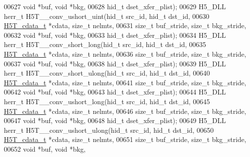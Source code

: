 \begin{DoxyCode}
00627                                    \textcolor{keywordtype}{void} *buf, \textcolor{keywordtype}{void} *bkg,
00628                                    hid\_t dset\_xfer\_plist);
00629 H5\_DLL herr\_t H5T\_\_conv\_ushort\_uint(hid\_t src\_id, hid\_t dst\_id,
00630                     \hyperlink{struct_h5_t__cdata__t}{H5T\_cdata\_t} *cdata, \textcolor{keywordtype}{size\_t} nelmts,
00631                     \textcolor{keywordtype}{size\_t} buf\_stride, \textcolor{keywordtype}{size\_t} bkg\_stride,
00632                                     \textcolor{keywordtype}{void} *buf, \textcolor{keywordtype}{void} *bkg,
00633                                     hid\_t dset\_xfer\_plist);
00634 H5\_DLL herr\_t H5T\_\_conv\_short\_long(hid\_t src\_id, hid\_t dst\_id,
00635                    \hyperlink{struct_h5_t__cdata__t}{H5T\_cdata\_t} *cdata, \textcolor{keywordtype}{size\_t} nelmts,
00636                    \textcolor{keywordtype}{size\_t} buf\_stride, \textcolor{keywordtype}{size\_t} bkg\_stride,
00637                                    \textcolor{keywordtype}{void} *buf, \textcolor{keywordtype}{void} *bkg,
00638                                    hid\_t dset\_xfer\_plist);
00639 H5\_DLL herr\_t H5T\_\_conv\_short\_ulong(hid\_t src\_id, hid\_t dst\_id,
00640                     \hyperlink{struct_h5_t__cdata__t}{H5T\_cdata\_t} *cdata, \textcolor{keywordtype}{size\_t} nelmts,
00641                     \textcolor{keywordtype}{size\_t} buf\_stride, \textcolor{keywordtype}{size\_t} bkg\_stride,
00642                                     \textcolor{keywordtype}{void} *buf, \textcolor{keywordtype}{void} *bkg,
00643                                     hid\_t dset\_xfer\_plist);
00644 H5\_DLL herr\_t H5T\_\_conv\_ushort\_long(hid\_t src\_id, hid\_t dst\_id,
00645                     \hyperlink{struct_h5_t__cdata__t}{H5T\_cdata\_t} *cdata, \textcolor{keywordtype}{size\_t} nelmts,
00646                     \textcolor{keywordtype}{size\_t} buf\_stride, \textcolor{keywordtype}{size\_t} bkg\_stride,
00647                                     \textcolor{keywordtype}{void} *buf, \textcolor{keywordtype}{void} *bkg,
00648                                     hid\_t dset\_xfer\_plist);
00649 H5\_DLL herr\_t H5T\_\_conv\_ushort\_ulong(hid\_t src\_id, hid\_t dst\_id,
00650                      \hyperlink{struct_h5_t__cdata__t}{H5T\_cdata\_t} *cdata, \textcolor{keywordtype}{size\_t} nelmts,
00651                      \textcolor{keywordtype}{size\_t} buf\_stride, \textcolor{keywordtype}{size\_t} bkg\_stride,
00652                                      \textcolor{keywordtype}{void} *buf, \textcolor{keywordtype}{void} *bkg,

\end{DoxyCode}
